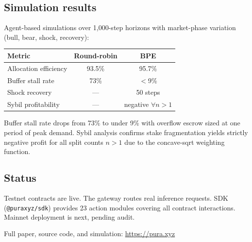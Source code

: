 \documentclass[10pt,twocolumn]{article}
\begin{document}
\subsection{Simulation results}

Agent-based simulations over 1,000-step horizons with market-phase variation
(bull, bear, shock, recovery):

\begin{center}
\begin{tabular}{@{}lcc@{}}
\toprule
Metric & Round-robin & BPE \\
\midrule
Allocation efficiency & 93.5\% & 95.7\% \\
Buffer stall rate & 73\% & $<$9\% \\
Shock recovery & --- & 50 steps \\
Sybil profitability & --- & negative $\forall n > 1$ \\
\bottomrule
\end{tabular}
\end{center}

Buffer stall rate drops from 73\% to under 9\% with overflow escrow sized at
one period of peak demand. Sybil analysis confirms stake fragmentation yields
strictly negative profit for all split counts $n > 1$ due to the concave-sqrt
weighting function.

\subsection{Status}

Testnet contracts are live. The gateway routes real inference requests. SDK
(\texttt{@puraxyz/sdk}) provides 23 action modules covering all contract
interactions. Mainnet deployment is next, pending audit.

Full paper, source code, and simulation: \url{https://pura.xyz}



\end{document}
